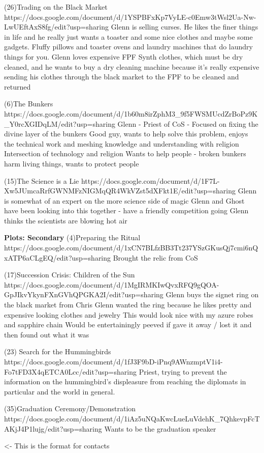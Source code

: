 \documentclass[char]{GL2020}
\begin{document}
(26)Trading on the Black Market
https://docs.google.com/document/d/1YSPBFxKp7VyLE-c0Emw3tWsl2Ua-Nw-LwUEftAxS8fg/edit?usp=sharing
Glenn is selling curses.  He likes the finer things in life and he really just wants a toaster and some nice clothes and maybe some gadgets.  Fluffy pillows and toaster ovens and laundry machines that do laundry things for you. Glenn loves expensive FPF Synth clothes, which must be dry cleaned, and he wants to buy a dry cleaning machine because it’s really expensive sending his clothes through the black market to the FPF to be cleaned and returned

(6)The Bunkers
https://docs.google.com/document/d/1b60m8irZphM3_9f5FWSMUcdZrBoPz9K_Y0rcXGIDqLM/edit?usp=sharing
Glenn - Priest of CoS -  Focused on fixing the divine layer of the bunkers
Good guy, wants to help solve this problem, enjoys the technical work and meshing knowledge and understanding with religion
Intersection of technology and religion
Wants to help people - broken bunkers harm living things, wants to protect people


(15)The Science is a Lie
https://docs.google.com/document/d/1F7L-Xw5JUmcaRrfGWNMFzNIGMqQR4WkVZst5dXFkt1E/edit?usp=sharing
Glenn is somewhat of an expert on the more science side of magic
Glenn and Ghost have been looking into this together - have a friendly competition going
Glenn thinks the scientists are blowing hot air


\textbf{Plots: Secondary}
(4)Preparing the Ritual
https://docs.google.com/document/d/1xCN7BLfzBB3Tt237YSzGKusQj7cmi6nQxATP6aCLgEQ/edit?usp=sharing
Brought the relic from CoS

(17)Succession Crisis: Children of the Sun
https://docs.google.com/document/d/1MgIRMKIwQvxRFQ9gQOA-GpJIkvYkynFXnGVhQPGKA2I/edit?usp=sharing
Glenn buys the signet ring on the black market from Chris
Glenn wanted the ring because he likes pretty and expensive looking clothes and jewelry
This would look nice with my azure robes and sapphire chain
Would be entertainingly peeved if gave it away / lost it and then found out what it was


(23) Search for the Hummingbirds
https://docs.google.com/document/d/1fJ3F9bD-iPnq9AWnzmptV1i4-Fo7tFD3X4qETCA0Lcc/edit?usp=sharing
Priest, trying to prevent the information on the hummingbird’s displeasure from reaching the diplomats in particular and the world in general.


(35)Graduation Ceremony/Demonstration
https://docs.google.com/document/d/1iAz5uNQaKwcLueLuVdehK_7QhkevpFcTAKjJ4P1lujg/edit?usp=sharing
Wants to be the graduation speaker


\begin{itemz}[Goals]
	\item 
\end{itemz}

\begin{itemz}[Notes]
	\item 
\end{itemz}

\begin{contacts}
	\contact{\cTest{}} <- This is the format for contacts 
\end{contacts}
\end{document}
